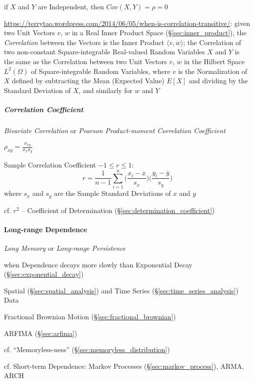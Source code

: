 if $X$ and $Y$ are Independent, then $Cov(X,Y) = \rho = 0$

\url{https://terrytao.wordpress.com/2014/06/05/when-is-correlation-transitive/}:
given two Unit Vectors $v$, $w$ in a Real Inner Product Space
(\S\ref{sec:inner_product}), the \emph{Correlation} between the Vectors is the
Inner Product $\langle{v,w}\rangle$; the Correlation of two non-constant
Square-integrable Real-valued Random Variables $X$ and $Y$ is the same as the
Correlation between two Unit Vectors $v$, $w$ in the Hilbert Space $L^2(\Omega)$
of Square-integrable Random Variables, where $v$ is the Normalization of $X$
defined by subtracting the Mean (Expected Value) $E[X]$ and dividing by the
Standard Deviation of $X$, and similarly for $w$ and $Y$



\subparagraph{Correlation Coefficient}\label{sec:correlation_coefficient}\hfill

\emph{Bivariate Correlation} or \emph{Pearson Product-moment Correlation
  Coefficient}

$\rho_{xy} = \frac{\sigma_{xy}}{\sigma_x \sigma_y}$

Sample Correlation Coefficient $-1 \leq r \leq 1$:
\[
  r = \frac{1}{n-1} \sum_{i=1}^n
    \Big(\frac{x_i - \overline{x}}{s_x}\Big)
    \Big(\frac{y_i - \overline{y}}{s_y}\Big)
\]
where $s_x$ and $s_y$ are the Sample Standard Deviations of $x$ and $y$

\fist cf. $r^2$ -- Coefficient of
Determination (\S\ref{sec:determination_coefficient})



\paragraph{Long-range Dependence}\label{sec:long_range_dependence}\hfill

\emph{Long Memory} or \emph{Long-range Persistence}

when Dependence decays more slowly than Exponential Decay
(\S\ref{sec:exponential_decay})

Spatial (\S\ref{sec:spatial_analysis}) and Time Series
(\S\ref{sec:time_series_analysis}) Data

\fist Fractional Brownian Motion (\S\ref{sec:fractional_brownian})

\fist ARFIMA (\S\ref{sec:arfima})

cf. ``Memoryless-ness'' (\S\ref{sec:memoryless_distribution})

cf. Short-term Dependence: Markov Processes (\S\ref{sec:markov_process}), ARMA,
ARCH

